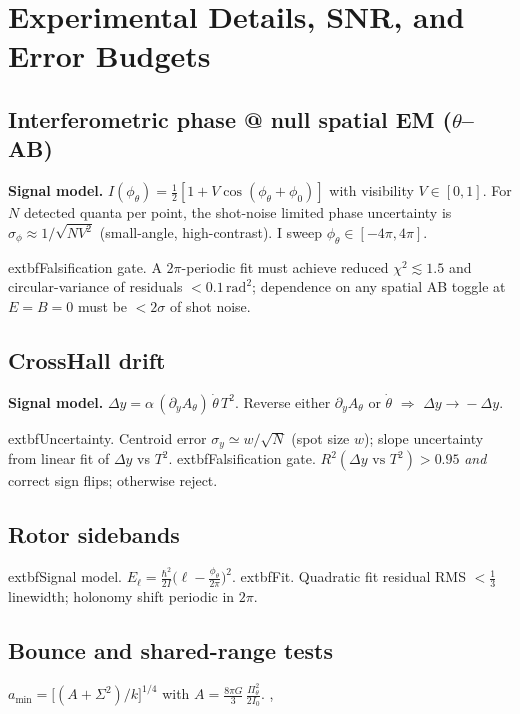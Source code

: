 \section*{Experimental Details, SNR, and Error Budgets}

\subsection*{Interferometric phase @ null spatial EM (\texorpdfstring{$\theta$--AB}{theta--AB})}
\textbf{Signal model.} $I(\phi_\theta)=\tfrac{1}{2}\!\left[1+V\cos(\phi_\theta+\phi_0)\right]$ with visibility $V\in[0,1]$.
For $N$ detected quanta per point, the shot-noise limited phase uncertainty is
$\sigma_\phi \approx 1/\sqrt{N V^2}$ (small-angle, high-contrast). I sweep $\phi_\theta\in[-4\pi,4\pi]$.

	extbf{Falsification gate.} A $2\pi$-periodic fit must achieve reduced $\chi^2\!\lesssim\!1.5$ and circular-variance of residuals $<0.1\,\mathrm{rad}^2$; dependence on any spatial AB toggle at $E{=}B{=}0$ must be $<2\sigma$ of shot noise.

\subsection*{Cross\textendash Hall drift}
\textbf{Signal model.} $\Delta y = \alpha\,(\partial_y A_\theta)\,\dot\theta\,T^2$. Reverse either $\partial_y A_\theta$ or $\dot\theta$ $\Rightarrow$ $\Delta y\!\to\! -\Delta y$.

	extbf{Uncertainty.} Centroid error $\sigma_y \simeq w/\sqrt{N}$ (spot size $w$); slope uncertainty from linear fit of $\Delta y$ vs $T^2$.  
	extbf{Falsification gate.} $R^2(\Delta y\text{ vs }T^2)\!>\!0.95$ \emph{and} correct sign flips; otherwise reject.

\subsection*{Rotor sidebands}
	extbf{Signal model.} $E_\ell=\frac{\hbar^2}{2I}\big(\ell-\frac{\phi_\theta}{2\pi}\big)^2$.  
	extbf{Fit.} Quadratic fit residual RMS $<\tfrac{1}{3}$ linewidth; holonomy shift periodic in $2\pi$.  

\subsection*{Bounce and shared-range tests}
$a_{\min}=\big[(A+\Sigma^2)/k\big]^{1/4}$ with $A=\tfrac{8\pi G}{3}\,\tfrac{\Pi_\theta^2}{2I_0}$.  
, 
